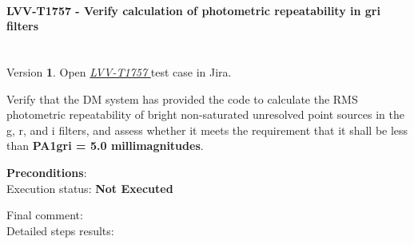\documentclass[DM,lsstdraft,STR,toc]{lsstdoc}
\begin{document}
\paragraph{ LVV-T1757 - Verify calculation of photometric repeatability in gri filters }\mbox{}\\

Version \textbf{1}.
Open  \href{https://jira.lsstcorp.org/secure/Tests.jspa#/testCase/LVV-T1757}{\textit{ LVV-T1757 } }
test case in Jira.

Verify that the DM system has provided the code to calculate the RMS
photometric repeatability of bright non-saturated unresolved point
sources in the g, r, and i filters, and assess whether it meets the
requirement that it shall be less than \textbf{PA1gri = 5.0
millimagnitudes}.

\textbf{ Preconditions}:\\


Execution status: {\bf Not Executed }

Final comment:\\


Detailed steps results:
\end{document}
